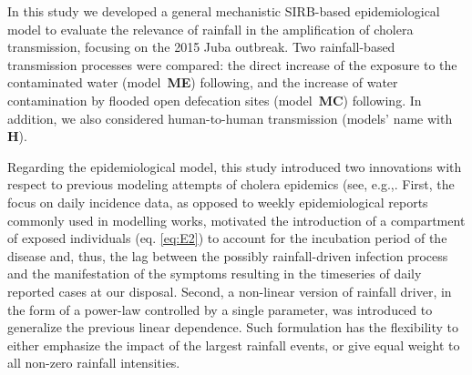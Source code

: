 In this study we developed a general mechanistic SIRB-based epidemiological model to evaluate the relevance of rainfall in the amplification of cholera transmission, focusing on the 2015 Juba outbreak. Two rainfall-based transmission processes were compared: the direct increase of the exposure to the contaminated water (model~\textbf{ME}) following\cite{Eisenberg:ExaminingRainfallCholera:2013}, and the increase of water contamination by flooded open defecation sites (model~\textbf{MC}) following\cite{Rinaldo:Reassessment20102011:2012}. In addition, we also considered human-to-human transmission (models' name with \textbf{H}).

Regarding the epidemiological model, this study introduced two innovations with respect to previous modeling attempts of cholera epidemics (see, e.g.,\cite{Bertuzzo:ProbabilityExtinctionHaiti:2016,Pasetto:RealtimeProjectionsCholera:2017}. First, the focus on daily incidence data, as opposed to weekly epidemiological reports commonly used in modelling works, motivated the introduction of a compartment of exposed individuals (eq. \ref{eq:E2}) to account for the incubation period of the disease and, thus, the lag between the possibly rainfall-driven infection process and the manifestation of the symptoms resulting in the timeseries of daily reported cases at our disposal. %
Second, a non-linear version of rainfall driver, in the form of a power-law controlled by a single parameter, was introduced to generalize the previous linear dependence. Such formulation has the flexibility to either emphasize the impact of the largest rainfall events, or give equal weight to all non-zero rainfall intensities. %


